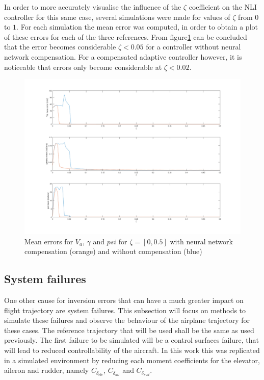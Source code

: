 In order to more accurately visualise the influence of the $\zeta$ coefficient on the NLI controller for this same case, several simulations were made for values of $\zeta$ from $0$ to $1$. For each simulation the mean error was computed, in order to obtain a plot of these errors for each of the three references. From figure\ref{fig:xi_mean_error} can be concluded that the error becomes considerable $\zeta<0.05$ for a controller without neural network compensation. For a compensated adaptive controller however, it is noticeable that errors only become considerable at $\zeta<0.02$.


\begin{figure}[H]
\centering
\includegraphics[width=\textwidth]{Figures/Results/mean_error_xi.png}
\caption[Mean errors for $V_a$, $\gamma$ and $psi$]{Mean errors for $V_a$, $\gamma$ and $psi$ for $\zeta=[0,0.5]$ with neural network compensation (orange) and without compensation (blue)}
\label{fig:xi_mean_error}
\end{figure}




\subsection{System failures}

One other cause for inversion errors that can have a much greater impact on flight trajectory are system failures. This subsection will focus on methods to simulate these failures and observe the behaviour of the airplane trajectory for these cases. The reference trajectory that will be used shall be the same as used previously. The first failure to be simulated will be a control surfaces failure, that will lead to reduced controllability of the aircraft. In this work this was replicated in a simulated environment by reducing each moment coefficients for the elevator, aileron and rudder, namely $C_{\delta_{ele}}$, $C_{\delta_{ail}}$ and $C_{\delta_{rud}}$.

